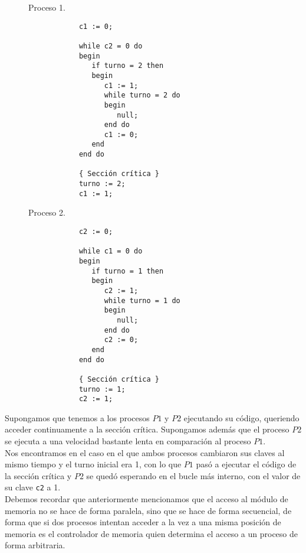 \begin{description}
    \begin{figure}[H]
    \centering
    \setlength{\columnsep}{1cm} %
    \begin{multicols}{2}
        Proceso 1.
        \begin{verbatim}
            c1 := 0;

            while c2 = 0 do
            begin
               if turno = 2 then
               begin
                  c1 := 1;
                  while turno = 2 do
                  begin
                     null;
                  end do
                  c1 := 0;
               end
            end do

            { Sección crítica }
            turno := 2;
            c1 := 1;
        \end{verbatim}
        Proceso 2.
        \begin{verbatim}
            c2 := 0;

            while c1 = 0 do
            begin
               if turno = 1 then
               begin
                  c2 := 1;
                  while turno = 1 do
                  begin
                     null;
                  end do
                  c2 := 0;
               end
            end do

            { Sección crítica }
            turno := 1;
            c2 := 1;
        \end{verbatim}
    \end{multicols}
        
    \end{figure}
    
    Supongamos que tenemos a los procesos $P1$ y $P2$ ejecutando su código, queriendo acceder continuamente a la sección crítica. Supongamos además que el proceso $P2$ se ejecuta a una velocidad bastante lenta en comparación al proceso $P1$.\\ 

    Nos encontramos en el caso en el que ambos procesos cambiaron sus claves al mismo tiempo y el turno inicial era 1, con lo que $P1$ pasó a ejecutar el código de la sección crítica y $P2$ se quedó esperando en el bucle más interno, con el valor de su clave \verb|c2| a 1.\\

    Debemos recordar que anteriormente mencionamos que el acceso al módulo de memoria no se hace de forma paralela, sino que se hace de forma secuencial, de forma que si dos procesos intentan acceder a la vez a una misma posición de memoria es el controlador de memoria quien determina el acceso a un proceso de forma arbitraria.\\


\end{description}
